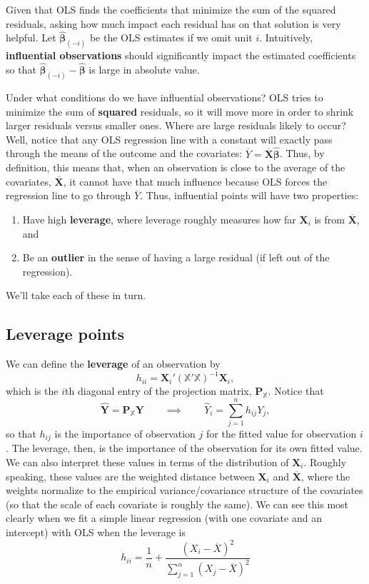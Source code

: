 \documentclass[
  letterpaper,
  DIV=11,
  numbers=noendperiod]{scrreprt}
\providecommand{\tightlist}{%
  \setlength{\itemsep}{0pt}\setlength{\parskip}{0pt}}\usepackage{longtable,booktabs,array}
\newcommand{\mb}{\symbf}
\newcommand{\X}{\mb{X}}
\newcommand{\Xmat}{\mathbb{X}}
\newcommand{\bhat}{\widehat{\mb{\beta}}}
\theoremstyle{plain}
\theoremstyle{definition}
\theoremstyle{definition}
\theoremstyle{remark}
\begin{document}
Given that OLS finds the coefficients that minimize the sum of the
squared residuals, asking how much impact each residual has on that
solution is very helpful. Let \(\bhat_{(-i)}\) be the OLS estimates if
we omit unit \(i\). Intuitively, \textbf{influential observations}
should significantly impact the estimated coefficients so that
\(\bhat_{(-i)} - \bhat\) is large in absolute value.

Under what conditions do we have influential observations? OLS tries to
minimize the sum of \textbf{squared} residuals, so it will move more in
order to shrink larger residuals versus smaller ones. Where are large
residuals likely to occur? Well, notice that any OLS regression line
with a constant will exactly pass through the means of the outcome and
the covariates: \(\overline{Y} = \overline{\X}\bhat\). Thus, by
definition, this means that, when an observation is close to the average
of the covariates, \(\overline{\X}\), it cannot have that much influence
because OLS forces the regression line to go through \(\overline{Y}\).
Thus, influential points will have two properties:

\begin{enumerate}
\def\labelenumi{\arabic{enumi}.}
\tightlist
\item
  Have high \textbf{leverage}, where leverage roughly measures how far
  \(\X_i\) is from \(\overline{\X}\), and
\item
  Be an \textbf{outlier} in the sense of having a large residual (if
  left out of the regression).
\end{enumerate}

We'll take each of these in turn.

\hypertarget{sec-leverage}{%
\subsection{Leverage points}\label{sec-leverage}}

We can define the \textbf{leverage} of an observation by \[ 
h_{ii} = \X_{i}'\left(\Xmat'\Xmat\right)^{-1}\X_{i},
\] which is the \(i\)th diagonal entry of the projection matrix,
\(\mb{P}_{\Xmat}\). Notice that \[ 
\widehat{\mb{Y}} = \mb{P}_{\Xmat}\mb{Y} \qquad \implies \qquad \widehat{Y}_i = \sum_{j=1}^n h_{ij}Y_j,
\] so that \(h_{ij}\) is the importance of observation \(j\) for the
fitted value for observation \(i\). The leverage, then, is the
importance of the observation for its own fitted value. We can also
interpret these values in terms of the distribution of \(\X_{i}\).
Roughly speaking, these values are the weighted distance between
\(\X_i\) and \(\overline{\X}\), where the weights normalize to the
empirical variance/covariance structure of the covariates (so that the
scale of each covariate is roughly the same). We can see this most
clearly when we fit a simple linear regression (with one covariate and
an intercept) with OLS when the leverage is \[ 
h_{ii} = \frac{1}{n} + \frac{(X_i - \overline{X})^2}{\sum_{j=1}^n (X_j - \overline{X})^2}
\]
\end{document}

